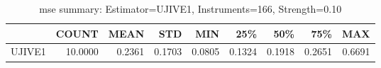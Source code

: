 \begin{table}[ht]
\centering
\caption{mse summary: Estimator=UJIVE1, Instruments=166, Strength=0.10}
\begin{tabular}{lrrrrrrrr}
\toprule
 & COUNT & MEAN & STD & MIN & 25\% & 50\% & 75\% & MAX \\
\midrule
UJIVE1 & 10.0000 & 0.2361 & 0.1703 & 0.0805 & 0.1324 & 0.1918 & 0.2651 & 0.6691 \\
\bottomrule
\end{tabular}
\end{table}
